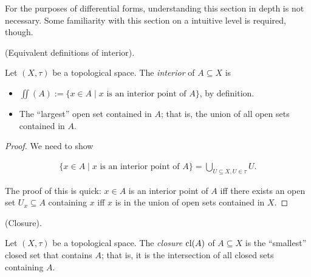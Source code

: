 For the purposes of differential forms, understanding this section in depth is not necessary. Some familiarity with this section on a intuitive level is required, though.

\begin{theorem}
    (Equivalent definitions of interior).
    
    Let $(X, \tau)$ be a topological space. The \textit{interior} of $A \subseteq X$ is
    
    \begin{itemize}
        \item $\iint(A) := \{ x \in A \mid \text{$x$ is an interior point of $A$} \}$, by definition.
        \item The ``largest'' open set contained in $A$; that is, the union of all open sets contained in $A$.
    \end{itemize}
\end{theorem}

\begin{proof}
    We need to show
    
    \begin{align*}
        \{ x \in A \mid \text{$x$ is an interior point of $A$} \}
        =
        \bigcup_{U \subseteq X, U \in \tau} U.
    \end{align*}
    
    The proof of this is quick: $x \in A$ is an interior point of $A$ iff there exists an open set $U_x \subseteq A$ containing $x$ iff $x$ is in the union of open sets contained in $X$.
\end{proof}

\begin{defn}
    (Closure).
    
    Let $(X, \tau)$ be a topological space. The \textit{closure} $\text{cl}(A)$ of $A \subseteq X$ is the ``smallest'' closed set that contains $A$; that is, it is the intersection of all closed sets containing $A$.
\end{defn}

